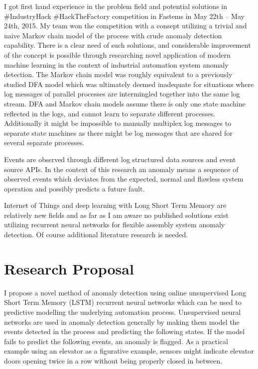 \documentclass[a4paper,10pt]{article}
\begin{document}
I got first hand experience in the problem field and potential solutions in \#IndustryHack \#HackTheFactory competition in Fastems in May 22th – May 24th, 2015\cite{IndustryHack}.
My team won the competition with a consept utilizing a trivial and naive Markov chain model of the process with crude anomaly detection capability.
There is a clear need of such solutions, and considerable improvement of the concept is possible through researching novel application of modern machine learning in the context
of industrial automation system anomaly detection. The Markov chain model was roughly equivalent to a previously studied DFA model\cite{langer2011self} which was
ultimately deemed inadequate for
situations where log messages of parallel processes are intermingled together into the same log stream. DFA and Markov chain models assume there is only one state machine
reflected in the logs, and cannot learn to separate different processes. Additionally it might be impossible to manually multiplex log messages to separate state machines
as there might be log messages that are shared for several separate processes.

Events are observed through different log structured data sources and event source APIs. In the context of this research an anomaly means a sequence of observed events which
deviates from the expected, normal and flawless system operation and possibly predicts a future fault.

Internet of Things and deep learning with Long Short Term Memory are relatively new fields and as far as I am aware no published solutions exist utilizing
recurrent neural networks for flexible assembly system anomaly detection. Of course additional literature research is needed.

\section{Research Proposal}

I propose a novel method of anomaly detection using online unsupervised Long Short Term Memory (LSTM)\cite{LSTM} recurrent neural networks which can be used to predictive
modelling\cite{gers2000learning} the underlying automation process. Unsupervised neural networks are used in anomaly detection generally by making them model the events detected
in the process and predicting the following states. If the model fails to predict the following events, an anomaly is flagged.
As a practical example using an elevator as a figurative example, sensors might indicate elevator doors opening twice in a row without being properly closed in between.
\end{document}
